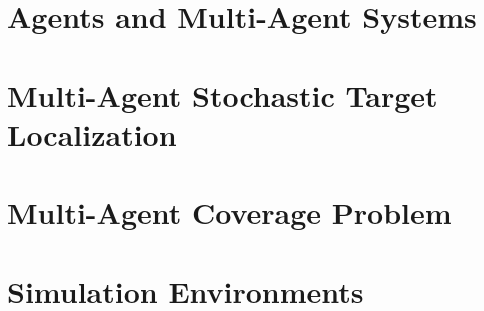 \section{Agents and Multi-Agent Systems}


\section{Multi-Agent Stochastic Target Localization}


\section{Multi-Agent Coverage Problem}


\section{Simulation Environments}


